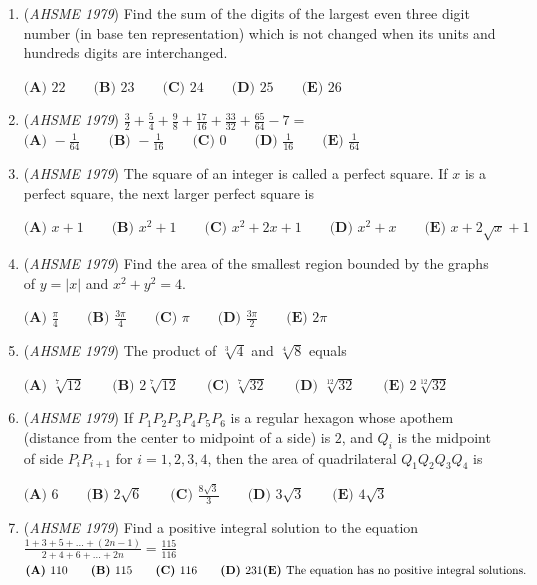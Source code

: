 \begin{enumerate}
	\item (\textit{AHSME 1979}) Find the sum of the digits of the largest even three digit number (in base ten representation) 
which is not changed when its units and hundreds digits are interchanged.


 $\textbf{(A) }22\qquad \textbf{(B) }23\qquad \textbf{(C) }24\qquad \textbf{(D) }25\qquad \textbf{(E) }26$


	\item (\textit{AHSME 1979}) $\frac{3}{2}+\frac{5}{4}+\frac{9}{8}+\frac{17}{16}+\frac{33}{32}+\frac{65}{64}-7=$
$\textbf{(A) }-\frac{1}{64}\qquad \textbf{(B) }-\frac{1}{16}\qquad \textbf{(C) }0\qquad \textbf{(D) }\frac{1}{16}\qquad \textbf{(E) }\frac{1}{64}$


	\item (\textit{AHSME 1979}) The square of an integer is called a perfect square. If $x$ is a perfect square, the next larger perfect square is


 $\textbf{(A) }x+1\qquad \textbf{(B) }x^2+1\qquad \textbf{(C) }x^2+2x+1\qquad \textbf{(D) }x^2+x\qquad \textbf{(E) }x+2\sqrt{x}+1$


	\item (\textit{AHSME 1979}) Find the area of the smallest region bounded by the graphs of $y=|x|$ and $x^2+y^2=4$.


 $\textbf{(A) }\frac{\pi}{4}\qquad \textbf{(B) }\frac{3\pi}{4}\qquad \textbf{(C) }\pi\qquad \textbf{(D) }\frac{3\pi}{2}\qquad \textbf{(E) }2\pi$


	\item (\textit{AHSME 1979}) The product of $\sqrt[3]{4}$ and $\sqrt[4]{8}$ equals


 $\textbf{(A) }\sqrt[7]{12}\qquad \textbf{(B) }2\sqrt[7]{12}\qquad \textbf{(C) }\sqrt[7]{32}\qquad \textbf{(D) }\sqrt[12]{32}\qquad \textbf{(E) }2\sqrt[12]{32}$


	\item (\textit{AHSME 1979}) If $P_1P_2P_3P_4P_5P_6$ is a regular hexagon whose apothem (distance from the center to midpoint of a side) is $2$, 
and $Q_i$ is the midpoint of side $P_iP_{i+1}$ for $i=1,2,3,4$, then the area of quadrilateral $Q_1Q_2Q_3Q_4$ is


 $\textbf{(A) }6\qquad \textbf{(B) }2\sqrt{6}\qquad \textbf{(C) }\frac{8\sqrt{3}}{3}\qquad \textbf{(D) }3\sqrt{3}\qquad \textbf{(E) }4\sqrt{3}$


	\item (\textit{AHSME 1979}) Find a positive integral solution to the equation
$\frac{1+3+5+\dots+(2n-1)}{2+4+6+\dots+2n}=\frac{115}{116}$
$\textbf{(A) }110\qquad \textbf{(B) }115\qquad \textbf{(C) }116\qquad \textbf{(D) }231\qquad\\ \textbf{(E) }\text{The equation has no positive integral solutions.}$



\end{enumerate}
